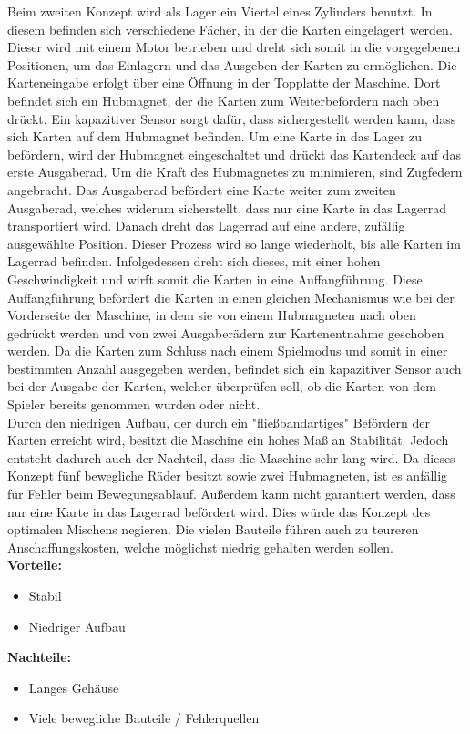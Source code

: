 Beim zweiten Konzept wird als Lager ein Viertel eines Zylinders benutzt. In diesem befinden
sich verschiedene Fächer, in der die Karten eingelagert werden. Dieser wird mit einem Motor betrieben
und dreht sich somit in die vorgegebenen Positionen, um das Einlagern und das Ausgeben der Karten zu ermöglichen.
Die Karteneingabe erfolgt über eine Öffnung in der Topplatte der Maschine. Dort befindet sich ein Hubmagnet, der die Karten
zum Weiterbefördern nach oben drückt. Ein kapazitiver Sensor sorgt dafür, dass sichergestellt werden kann, dass sich Karten auf dem Hubmagnet befinden.
Um eine Karte in das Lager zu befördern, wird der Hubmagnet eingeschaltet und drückt das Kartendeck auf das erste Ausgaberad. Um die Kraft des Hubmagnetes zu minimieren, sind Zugfedern angebracht.
Das Ausgaberad befördert eine Karte weiter zum zweiten Ausgaberad, welches widerum sicherstellt, dass nur eine Karte in das Lagerrad transportiert wird.
Danach dreht das Lagerrad auf eine andere, zufällig ausgewählte Position.
Dieser Prozess wird so lange wiederholt, bis alle Karten im Lagerrad befinden.
Infolgedessen dreht sich dieses, mit einer hohen Geschwindigkeit und wirft somit die Karten in eine Auffangführung.
Diese Auffangführung befördert die Karten in einen gleichen Mechanismus wie bei der Vorderseite der Maschine, in dem sie von einem Hubmagneten nach oben gedrückt werden und von zwei Ausgaberädern zur
Kartenentnahme geschoben werden.
Da die Karten zum Schluss nach einem Spielmodus und somit in einer bestimmten Anzahl ausgegeben werden, befindet sich ein kapazitiver Sensor auch bei der Ausgabe der Karten,
welcher überprüfen soll, ob die Karten von dem Spieler bereits genommen wurden oder nicht.\\

Durch den niedrigen Aufbau, der durch ein "fließbandartiges" Befördern der Karten erreicht wird, besitzt die Maschine ein hohes Maß an Stabilität. Jedoch entsteht dadurch auch der Nachteil, dass die Maschine sehr lang wird. Da dieses
Konzept fünf bewegliche Räder besitzt sowie zwei Hubmagneten, ist es anfällig für Fehler beim Bewegungsablauf.
Außerdem kann nicht garantiert werden, dass nur eine Karte in das Lagerrad befördert wird. Dies würde das Konzept des optimalen
Mischens negieren. Die vielen Bauteile führen auch zu teureren Anschaffungskosten, welche möglichst niedrig gehalten werden sollen.\\

\textbf{Vorteile:}
\begin{itemize}
    \item Stabil
    \item Niedriger Aufbau
\end{itemize}
\textbf{Nachteile:}
\begin{itemize}
    \item Langes Gehäuse
    \item Viele bewegliche Bauteile / Fehlerquellen
\end{itemize}
\newpage
